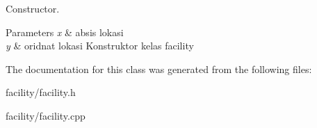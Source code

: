 Constructor. 


\begin{DoxyParams}{Parameters}
{\em x} & absis lokasi \\
\hline
{\em y} & oridnat lokasi Konstruktor kelas facility \\
\hline
\end{DoxyParams}


The documentation for this class was generated from the following files\+:\begin{DoxyCompactItemize}
\item 
facility/facility.\+h\item 
facility/facility.\+cpp\end{DoxyCompactItemize}
